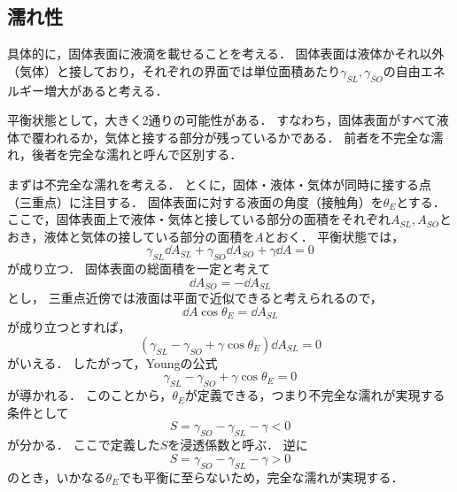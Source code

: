 \documentclass[a4paper,11pt]{jsarticle}
\begin{document}
\subsection{濡れ性}
具体的に，固体表面に液滴を載せることを考える．
固体表面は液体かそれ以外（気体）と接しており，それぞれの界面では単位面積あたり$\gamma_{SL}, \gamma_{SO}$の自由エネルギー増大があると考える．

平衡状態として，大きく2通りの可能性がある．
すなわち，固体表面がすべて液体で覆われるか，気体と接する部分が残っているかである．
前者を不完全な濡れ，後者を完全な濡れと呼んで区別する．

まずは不完全な濡れを考える．
とくに，固体・液体・気体が同時に接する点（三重点）に注目する．
固体表面に対する液面の角度（接触角）を$\theta_E$とする．
ここで，固体表面上で液体・気体と接している部分の面積をそれぞれ$A_{SL}, A_{SO}$とおき，液体と気体の接している部分の面積を$A$とおく．
平衡状態では，
\begin{equation}
  \gamma_{SL} \dd{A_{SL}} + \gamma_{SO}\dd{A_{SO}} + \gamma \dd{A} = 0
\end{equation}
が成り立つ．
固体表面の総面積を一定と考えて
\begin{equation}
  \dd{A_{SO}} = - \dd{A_{SL}}
\end{equation}
とし，
三重点近傍では液面は平面で近似できると考えられるので，
\begin{equation}
  \dd{A} \cos{\theta_E} = \dd{A_{SL}}
\end{equation}
が成り立つとすれば，
\begin{equation}
  \left(\gamma_{SL} - \gamma_{SO}+ \gamma \cos{\theta_E} \right)\dd{A_{SL}}  = 0
\end{equation}
がいえる．
したがって，Youngの公式
\begin{equation}
  \gamma_{SL} - \gamma_{SO}+ \gamma \cos{\theta_E} = 0
\end{equation}
が導かれる．
このことから，$\theta_E$が定義できる，つまり不完全な濡れが実現する条件として
\begin{equation}
  S = \gamma_{SO} - \gamma_{SL} - \gamma < 0
\end{equation}
が分かる．
ここで定義した$S$を浸透係数と呼ぶ．
逆に
\begin{equation}
  S = \gamma_{SO} - \gamma_{SL} - \gamma > 0
\end{equation}
のとき，いかなる$\theta_E$でも平衡に至らないため，完全な濡れが実現する．
\end{document}
